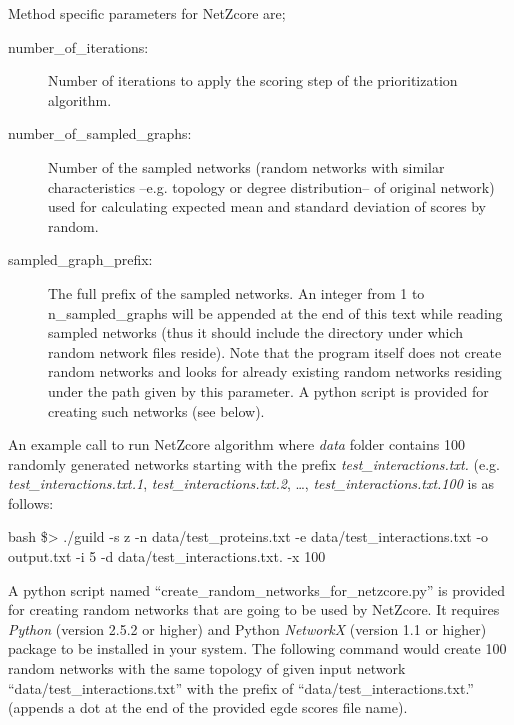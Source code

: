 \documentclass[11pt,twoside]{article}
\newcommand{\printcommand}[1]{\colorbox{code}{\scriptsize{\BUseVerbatim{#1}}}}
\begin{document}
\vspace{5 mm}
Method specific parameters for NetZcore are;
\begin{description}
    \item[number\_of\_iterations:] Number of iterations to apply the scoring 
	step of the prioritization algorithm. 
    \item[number\_of\_sampled\_graphs:] Number of the sampled networks (random 
	networks with similar characteristics --e.g. topology or degree 
	distribution-- of original network) used for calculating expected mean 
	and standard deviation of scores by random.
    \item[sampled\_graph\_prefix:] The full prefix of the sampled networks. An 
	integer from 1 to n\_sampled\_graphs will be appended at the end of 
	this text while reading sampled networks (thus it should include the 
	directory under which random network files reside). Note that the 
	program itself does not create random networks and looks for already 
	existing random networks residing under the path given by this parameter.
	A python script is provided for creating such networks (see below).
\end{description}

An example call to run NetZcore algorithm where \textit{data} 
folder contains 100 randomly generated networks starting with the prefix 
\textit{test\_interactions.txt.} (e.g. \textit{test\_interactions.txt.1}, 
\textit{test\_interactions.txt.2}, \ldots, \textit{test\_interactions.txt.100} 
is as follows:

\begin{SaveVerbatim}{bash}
\$> ./guild -s z -n data/test_proteins.txt -e data/test_interactions.txt -o output.txt -i 5 
	    -d data/test_interactions.txt. -x 100
\end{SaveVerbatim}
\printcommand{bash}

\vspace{5 mm}
A python script named ``create\_random\_networks\_for\_netzcore.py'' is provided 
for creating random networks that are going to be used by NetZcore. It requires 
\textit{Python} (version 2.5.2 or higher) and Python \textit{NetworkX} (version 
1.1 or higher) package to be installed in your system. The following command 
would create 100 random networks with the same topology of given input network
``data/test\_interactions.txt'' with the prefix of 
``data/test\_interactions.txt.'' (appends a dot at the end of the provided egde 
scores file name).
\end{document}
